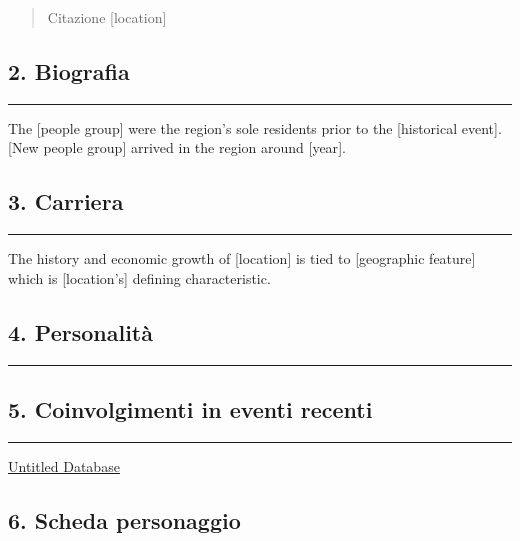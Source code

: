 \begin{quote}
Citazione {[}location{]}
\end{quote}

\subsection{2. Biografia}\label{biografia}

\begin{center}\rule{0.5\linewidth}{0.5pt}\end{center}

The {[}people group{]} were the region's sole residents prior to the
{[}historical event{]}. {[}New people group{]} arrived in the region
around {[}year{]}.

\subsection{3. Carriera}\label{carriera}

\begin{center}\rule{0.5\linewidth}{0.5pt}\end{center}

The history and economic growth of {[}location{]} is tied to
{[}geographic feature{]} which is {[}location's{]} defining
characteristic.

\subsection{4. Personalità}\label{personalituxe0}

\begin{center}\rule{0.5\linewidth}{0.5pt}\end{center}

\subsection{5. Coinvolgimenti in eventi
recenti}\label{coinvolgimenti-in-eventi-recenti}

\begin{center}\rule{0.5\linewidth}{0.5pt}\end{center}

\href{Untitled\%20Database\%2048eaef2d139146f79a5e3a2a6505755d.csv}{Untitled
Database}

\subsection{6. Scheda personaggio}\label{scheda-personaggio}

